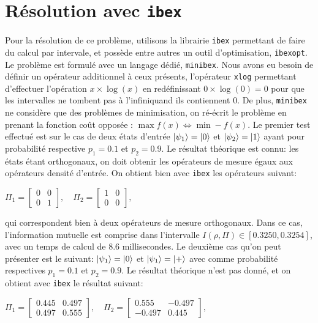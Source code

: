 \medbreak

\section{Résolution avec \texttt{ibex}}

Pour la résolution de ce problème, utilisons la librairie \texttt{ibex} permettant de faire du calcul par intervale, et possède entre autres un outil d'optimisation, \texttt{ibexopt}. Le problème est formulé avec un langage dédié, \texttt{minibex}. Nous avons eu besoin de définir un opérateur additionnel à ceux présents, l'opérateur \texttt{xlog} permettant d'effectuer l'opération $x \times \log(x)$ en redéfinissant $0 \times \log(0) = 0$ pour que les intervalles ne tombent pas à l'infiniquand ils contiennent 0. De plus, \texttt{minibex} ne considère que des problèmes de minimisation, on ré-écrit le problème en prenant la fonction coût opposée : $\max f(x) \Leftrightarrow \min -f(x)$.
\medbreak
Le premier test effectué est sur le cas de deux états d'entrée $\ket{\psi_1} = \ket{0}$ et $\ket{\psi_2} = \ket{1}$ ayant pour probabilité respective $p_1 = 0.1$ et $p_2 = 0.9$. Le résultat théorique est connu: les états étant orthogonaux, on doit obtenir les opérateurs de mesure égaux aux opérateurs densité d'entrée. On obtient bien avec \texttt{ibex} les opérateurs suivant:

$\Pi_1 = \begin{bmatrix} 0 & 0 \\ 0 & 1\end{bmatrix} , \quad \Pi_2 = \begin{bmatrix} 1 & 0 \\ 0 & 0\end{bmatrix},$

qui correspondent bien à deux opérateurs de mesure orthogonaux. Dans ce cas, l'information mutuelle est comprise dans l'intervalle $I(\rho, \Pi) \in [0.3250, 0.3254]$, avec un temps de calcul de 8.6 millisecondes.
\medbreak
Le deuxième cas qu'on peut présenter est le suivant: $\ket{\psi_1} = \ket{0}$ et $\ket{\psi_1} = \ket{+}$ avec comme probabilité respectives $p_1 = 0.1$ et $p_2 = 0.9$. Le résultat théorique n'est pas donné, et on obtient avec \texttt{ibex} le résultat suivant:

$\Pi_1 = \begin{bmatrix} 0.445 & 0.497 \\ 0.497 & 0.555\end{bmatrix} , \quad \Pi_2 = \begin{bmatrix} 0.555 & -0.497 \\ -0.497 & 0.445\end{bmatrix},$

